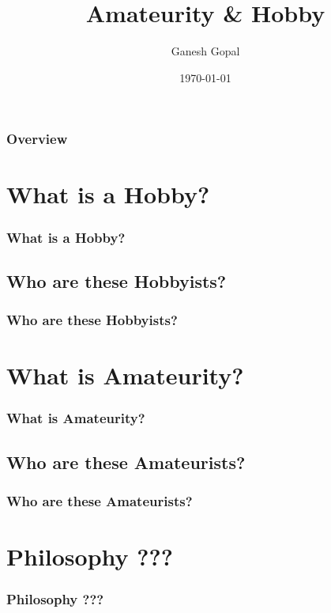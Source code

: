 \documentclass{beamer}
\title[Amateurity]{Amateurity \& Hobby}
\author{Ganesh Gopal}
\institute[AIM] 
{
Anti-Ignorance Movement \\ 
\medskip
\textit{31gane@gmail.com} 
}
\date{\today}
\begin{document}
\begin{frame}
\titlepage 
\end{frame}

\begin{frame}
\frametitle{Overview} %
\tableofcontents 
\end{frame}


\section{What is a Hobby?}
\begin{frame}
  \frametitle{What is a Hobby?}
\end{frame}

\subsection{Who are these Hobbyists?}
\begin{frame}
  \frametitle{Who are these Hobbyists?}
\end{frame}

\section{What is Amateurity?}
\begin{frame}
  \frametitle{What is Amateurity?}
\end{frame}

\subsection{Who are these Amateurists?}
\begin{frame}
  \frametitle{Who are these Amateurists?}
\end{frame}


\section{Philosophy ???}
\begin{frame}
  \frametitle{Philosophy ???}
\end{frame}
\end{document}
